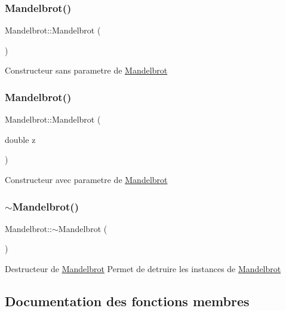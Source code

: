 \subsubsection{\texorpdfstring{Mandelbrot()}{Mandelbrot()}\hspace{0.1cm}{\footnotesize\ttfamily [1/2]}}
{\footnotesize\ttfamily Mandelbrot\+::\+Mandelbrot (\begin{DoxyParamCaption}{ }\end{DoxyParamCaption})}

Constructeur sans parametre de \hyperlink{classMandelbrot}{Mandelbrot} \mbox{\label{classMandelbrot_a9c02f4bdf09c40ae7ea17580d5a2a525}} 
\subsubsection{\texorpdfstring{Mandelbrot()}{Mandelbrot()}\hspace{0.1cm}{\footnotesize\ttfamily [2/2]}}
{\footnotesize\ttfamily Mandelbrot\+::\+Mandelbrot (\begin{DoxyParamCaption}\item[{double}]{z }\end{DoxyParamCaption})}

Constructeur avec parametre de \hyperlink{classMandelbrot}{Mandelbrot} \mbox{\label{classMandelbrot_a4ffabf508467746a74459b53826504a0}} 
\subsubsection{\texorpdfstring{$\sim$\+Mandelbrot()}{~Mandelbrot()}}
{\footnotesize\ttfamily Mandelbrot\+::$\sim$\+Mandelbrot (\begin{DoxyParamCaption}{ }\end{DoxyParamCaption})}

Destructeur de \hyperlink{classMandelbrot}{Mandelbrot} Permet de detruire les instances de \hyperlink{classMandelbrot}{Mandelbrot} 

\subsection{Documentation des fonctions membres}
\mbox{\label{classMandelbrot_afc2cf40855f646200d54c263929d3eca}} 
